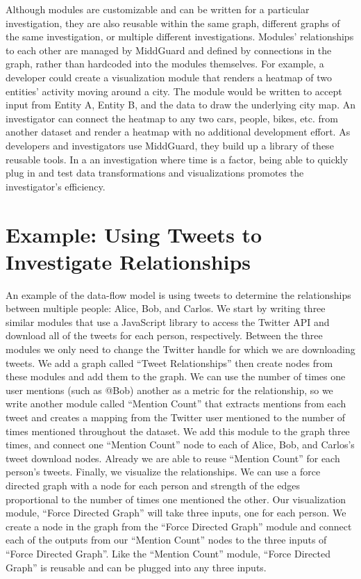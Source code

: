 \documentclass[midd]{thesis}
\begin{document}
Although modules are customizable and can be written for a particular
investigation, they are also reusable within the same graph, different graphs of
the same investigation, or multiple different investigations. Modules'
relationships to each other are managed by MiddGuard and defined by connections
in the graph, rather than hardcoded into the modules themselves. For example, a
developer could create a visualization module that renders a heatmap of two
entities' activity moving around a city. The module would be written to accept
input from Entity A, Entity B, and the data to draw the underlying city map. An
investigator can connect the heatmap to any two cars, people, bikes, etc. from
another dataset and render a heatmap with no additional development effort. As
developers and investigators use MiddGuard, they build up a library of these
reusable tools. In a an investigation where time is a factor, being able to
quickly plug in and test data transformations and visualizations promotes the
investigator's efficiency.

\section{Example: Using Tweets to Investigate Relationships}

An example of the data-flow model is using tweets to determine the relationships
between multiple people: Alice, Bob, and Carlos. We start by writing three
similar modules that use a JavaScript library to access the Twitter API and
download all of the tweets for each person, respectively. Between the three
modules we only need to change the Twitter handle for which we are downloading
tweets. We add a graph called ``Tweet Relationships'' then create nodes from
these modules and add them to the graph. We can use the number of times one user
mentions (such as @Bob) another as a metric for the relationship, so we write
another module called ``Mention Count'' that extracts mentions from each tweet
and creates a mapping from the Twitter user mentioned to the number of times
mentioned throughout the dataset. We add this module to the graph three times,
and connect one ``Mention Count'' node to each of Alice, Bob, and Carlos's tweet
download nodes. Already we are able to reuse ``Mention Count'' for each person's
tweets. Finally, we visualize the relationships. We can use a force directed
graph with a node for each person and strength of the edges proportional to the
number of times one mentioned the other. Our visualization module, ``Force
Directed Graph'' will take three inputs, one for each person. We create a node
in the graph from the ``Force Directed Graph'' module and connect each of the
outputs from our ``Mention Count'' nodes to the three inputs of ``Force Directed
Graph''. Like the ``Mention Count'' module, ``Force Directed Graph'' is reusable
and can be plugged into any three inputs.
\end{document}

